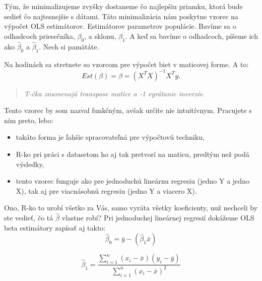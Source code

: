 Tým, že minimalizujeme zvyšky dostaneme čo najlepšiu priamku, ktorá bude
sedieť čo najtesnejšie s dátami. Táto minimalizácia nám poskytne vzorec
na výpočet OLS estimátorov. Estimátorov parametrov populácie. Bavíme sa
o odhadcoch priesečníka, \(\beta_0\), a sklonu, \(\beta_1\). A keď sa
bavíme o odhadcoch, píšeme ich ako \(\hat\beta_0\) a \(\hat\beta_1\).
Nech si pamätáte.

Na hodinách sa stretnete so vzorcom pre výpočet biet v maticovej forme.
A to:
\[Est(\beta) = \hat\beta = (X^TX)^{-1}X^Ty.\]

\begin{quote}
\emph{T-čka znamenajú transpose matice a -1 vyrátanie inverzie.}
\end{quote}

\begin{Shaded}
\end{Shaded}

Tento vzorec by som nazval funkčným, avšak určite nie intuitívnym.
Pracujete s ním preto, lebo:

\begin{itemize}
\tightlist
\item
  takáto forma je ľahšie spracovateľná pre výpočtovú techniku,
\item
  R-ko pri práci s datasetom ho aj tak pretvorí na maticu, predtým než
  podá výsledky,
\item
  tento vzorec funguje ako pre jednoduchú lineárnu regresiu (jedno Y a
  jedno X), tak aj pre viacnásobnú regresiu (jedno Y a viacero X).
\end{itemize}

Ono, R-ko to urobí všetko za Vás, samo vyráta všetky koeficienty, nuž
nechceli by ste vedieť, čo tá \(\hat\beta\) vlastne robí? Pri
jednoduchej lineárnej regresií dokážeme OLS beta estimátory zapísať aj
takto:
\[\hat\beta_0 = \overline{y} - (\hat\beta_1\overline{x})\]

\[\hat\beta_1 = \frac{\sum_{i=1}^{n} (x_i - \overline{x})(y_i - \overline{y})}{\sum_{i=1}^{n} (x_i - \overline{x})^2}\]


